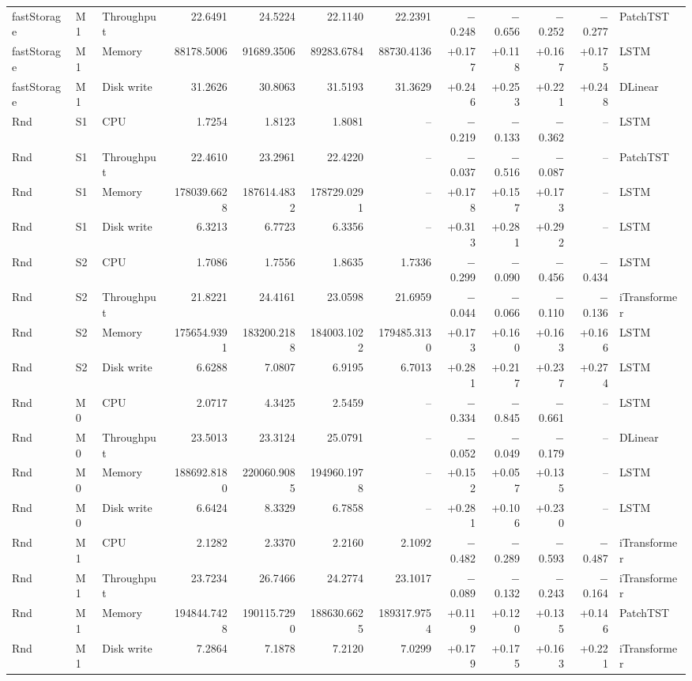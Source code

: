 \begin{longtable}{@{}lllrrrrrrrrl@{}}
fastStorage & M1 & Throughput & 22.6491 & 24.5224 & 22.1140 & 22.2391 & $-$0.248 & $-$0.656 & $-$0.252 & $-$0.277 & PatchTST \\
fastStorage & M1 & Memory & 88178.5006 & 91689.3506 & 89283.6784 & 88730.4136 & +0.177 & +0.118 & +0.167 & +0.175 & LSTM \\
fastStorage & M1 & Disk write & 31.2626 & 30.8063 & 31.5193 & 31.3629 & +0.246 & +0.253 & +0.221 & +0.248 & DLinear \\
Rnd & S1 & CPU & 1.7254 & 1.8123 & 1.8081 & -- & $-$0.219 & $-$0.133 & $-$0.362 & -- & LSTM \\
Rnd & S1 & Throughput & 22.4610 & 23.2961 & 22.4220 & -- & $-$0.037 & $-$0.516 & $-$0.087 & -- & PatchTST \\
Rnd & S1 & Memory & 178039.6628 & 187614.4832 & 178729.0291 & -- & +0.178 & +0.157 & +0.173 & -- & LSTM \\
Rnd & S1 & Disk write & 6.3213 & 6.7723 & 6.3356 & -- & +0.313 & +0.281 & +0.292 & -- & LSTM \\
Rnd & S2 & CPU & 1.7086 & 1.7556 & 1.8635 & 1.7336 & $-$0.299 & $-$0.090 & $-$0.456 & $-$0.434 & LSTM \\
Rnd & S2 & Throughput & 21.8221 & 24.4161 & 23.0598 & 21.6959 & $-$0.044 & $-$0.066 & $-$0.110 & $-$0.136 & iTransformer \\
Rnd & S2 & Memory & 175654.9391 & 183200.2188 & 184003.1022 & 179485.3130 & +0.173 & +0.160 & +0.163 & +0.166 & LSTM \\
Rnd & S2 & Disk write & 6.6288 & 7.0807 & 6.9195 & 6.7013 & +0.281 & +0.217 & +0.237 & +0.274 & LSTM \\
Rnd & M0 & CPU & 2.0717 & 4.3425 & 2.5459 & -- & $-$0.334 & $-$0.845 & $-$0.661 & -- & LSTM \\
Rnd & M0 & Throughput & 23.5013 & 23.3124 & 25.0791 & -- & $-$0.052 & $-$0.049 & $-$0.179 & -- & DLinear \\
Rnd & M0 & Memory & 188692.8180 & 220060.9085 & 194960.1978 & -- & +0.152 & +0.057 & +0.135 & -- & LSTM \\
Rnd & M0 & Disk write & 6.6424 & 8.3329 & 6.7858 & -- & +0.281 & +0.106 & +0.230 & -- & LSTM \\
Rnd & M1 & CPU & 2.1282 & 2.3370 & 2.2160 & 2.1092 & $-$0.482 & $-$0.289 & $-$0.593 & $-$0.487 & iTransformer \\
Rnd & M1 & Throughput & 23.7234 & 26.7466 & 24.2774 & 23.1017 & $-$0.089 & $-$0.132 & $-$0.243 & $-$0.164 & iTransformer \\
Rnd & M1 & Memory & 194844.7428 & 190115.7290 & 188630.6625 & 189317.9754 & +0.119 & +0.120 & +0.135 & +0.146 & PatchTST \\
Rnd & M1 & Disk write & 7.2864 & 7.1878 & 7.2120 & 7.0299 & +0.179 & +0.175 & +0.163 & +0.221 & iTransformer \\
\end{longtable}
\normalsize\setlength{\tabcolsep}{4pt}

